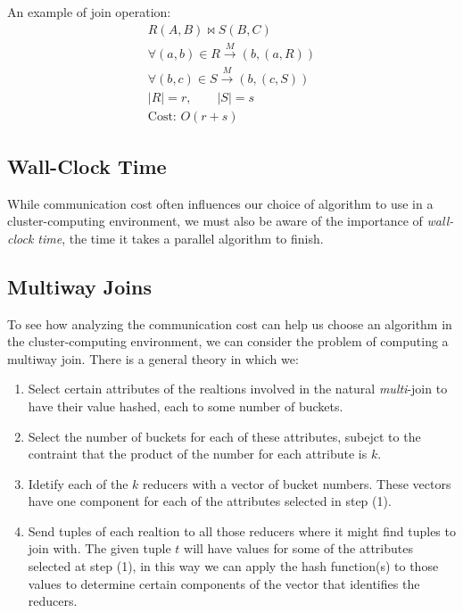 An example of join operation:
\begin{equation*}
    \begin{split}
        R(A,B) \bowtie S(B,C) \\
        \forall (a,b) \in R \xrightarrow{M} (b, (a,R)) \\
        \forall (b,c) \in S \xrightarrow{M} (b, (c,S)) \\
        |R|=r, \qquad |S|=s \\
        \text{Cost: } O(r+s)
    \end{split}
\end{equation*}

\subsection{Wall-Clock Time}\label{subsec:wall-clock-time}

While communication cost often influences our choice of algorithm to use in a cluster-computing environment, we must also be aware of the importance of \textit{wall-clock time}, the time it takes a parallel algorithm to finish.

\subsection{Multiway Joins}\label{subsec:multiway-joins}

To see how analyzing the communication cost can help us choose an algorithm in the cluster-computing environment, we can consider the problem of computing a multiway join. There is a general theory in which we:
\begin{enumerate}
    \item Select certain attributes of the realtions involved in the natural \textit{multi}-join to have their value hashed, each to some number of buckets.
    \item Select the number of buckets for each of these attributes, subejct to the contraint that the product of the number for each attribute is $k$. 
    \item Idetify each of the $k$ reducers with a vector of bucket numbers. These vectors have one component for each of the attributes selected in step (1).
    \item Send tuples of each realtion to all those reducers where it might find tuples to join with. The given tuple $t$ will have values for some of the attributes selected at step (1), in this way we can apply the hash function(s) to those values to determine certain components of the vector that identifies the reducers. 
\end{enumerate}
